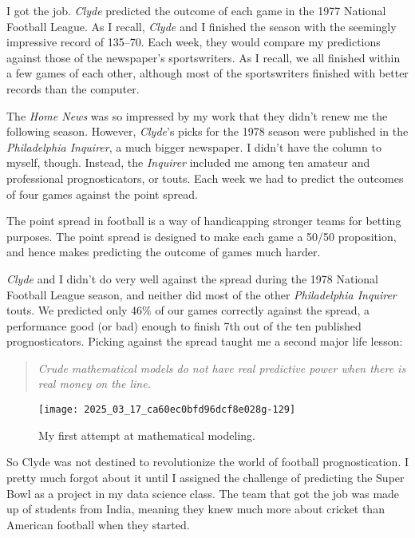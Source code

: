 \documentclass[10pt]{article}
\begin{document}
I got the job. \textit{Clyde} predicted the outcome of each game in the 1977 National Football League. As I recall, \textit{Clyde} and I finished the season with the seemingly impressive record of 135–70. Each week, they would compare my predictions against those of the newspaper’s sportswriters. As I recall, we all finished within a few games of each other, although most of the sportswriters finished with better records than the computer.

The \textit{Home News} was so impressed by my work that they didn’t renew me the following season. However, \textit{Clyde}’s picks for the 1978 season were published in the \textit{Philadelphia Inquirer}, a much bigger newspaper. I didn’t have the column to myself, though. Instead, the \textit{Inquirer} included me among ten amateur and professional prognosticators, or touts. Each week we had to predict the outcomes of four games against the point spread.

The point spread in football is a way of handicapping stronger teams for betting purposes. The point spread is designed to make each game a 50/50 proposition, and hence makes predicting the outcome of games much harder.

\textit{Clyde} and I didn’t do very well against the spread during the 1978 National Football League season, and neither did most of the other \textit{Philadelphia Inquirer} touts. We predicted only 46\% of our games correctly against the spread, a performance good (or bad) enough to finish 7th out of the ten published prognosticators. Picking against the spread taught me a second major life lesson:

\begin{quote}
    \textit{Crude mathematical models do not have real predictive power when there is real money on the line.}
\end{quote}

\begin{figure}
    \centering
    \texttt{[image: 2025\_03\_17\_ca60ec0bfd96dcf8e028g-129]}
    \caption{My first attempt at mathematical modeling.}
\end{figure}

So Clyde was not destined to revolutionize the world of football prognostication. I pretty much forgot about it until I assigned the challenge of predicting the Super Bowl as a project in my data science class. The team that got the job was made up of students from India, meaning they knew much more about cricket than American football when they started.
\end{document}
